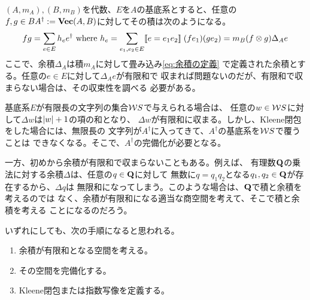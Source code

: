 	\begin{note}[余積と無限]\label{note:余積と無限} %
		$(A,m_A),(B,m_B)$を代数、$E$を$A$の基底系とすると、任意の
		$f,g\in BA^\dag:={\mathbf{Vec}}(A,B)$に対してその積は次のようになる。
		\begin{equation*}\begin{split}
			fg = \sum_{e\in E}h_ee^\dag
			\text{ where }h_e = \sum_{e_1,e_2\in E}[\![e=e_1e_2]\!]\;(fe_1)(ge_2)
			= m_B(f\otimes g)\Delta_Ae
		\end{split}\end{equation*}
		ここで、余積$\Delta_A$は積$m_A$に対して畳み込み\eqref{eq:余積の定義}
		で定義された余積とする。任意の$e\in E$に対して$\Delta_Ae$が有限和で
		収まれば問題ないのだが、有限和で収まらない場合は、その収束性を調べる
		必要がある。
		
		基底系$E$が有限長の文字列の集合${{\mathcal{W}}} S$で与えられる場合は、
		任意の$w\in{\ensuremath{{\mathcal{W}}}} S$に対して$\Delta w$は$\left|{w}\right|+1$の項の和となり、
		$\Delta w$が有限和に収まる。しかし、Kleene閉包をした場合には、無限長の
		文字列が$A^\dag$に入ってきて、$A^\dag$の基底系を${{\mathcal{W}}} S$で覆うことは
		できなくなる。そこで、$A^\dag$の完備化が必要となる。

		一方、初めから余積が有限和で収まらないこともある。例えば、
		有理数$\mathbf{Q}$の乗法に対する余積$\Delta$は、任意の$q\in\mathbf{Q}$に対して
		無数に$q=q_1q_2$となる$q_1,q_2\in\mathbf{Q}$が存在するから、$\Delta q$は
		無限和になってしまう。このような場合は、$\mathbf{Q}$で積と余積を考えるのでは
		なく、余積が有限和になる適当な商空間を考えて、そこで積と余積を考える
		ことになるのだろう。

		いずれにしても、次の手順になると思われる。
		\begin{enumerate}\setlength{\itemsep}{-1mm} %
			\item 余積が有限和となる空間を考える。
			\item その空間を完備化する。
			\item Kleene閉包または指数写像を定義する。
		\end{enumerate} %
	\end{note} %
